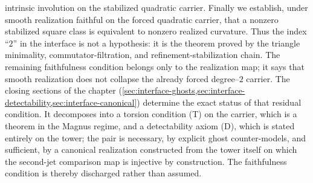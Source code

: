 intrinsic involution on the stabilized quadratic carrier.
Finally we establish, under smooth realization faithful on the forced
quadratic carrier, that a nonzero stabilized square class is equivalent
to nonzero realized curvature.
Thus the index ``\(2\)'' in the interface is not a hypothesis: it is
the theorem proved by the triangle minimality, commutator-filtration,
and refinement-stabilization chain.  The remaining faithfulness
condition belongs only to the realization map; it says that smooth
realization does not collapse the already forced degree--\(2\) carrier.
The closing sections of the chapter
(\cref{sec:interface-ghosts,sec:interface-detectability,sec:interface-canonical})
determine the exact status of that residual condition.  It decomposes
into a torsion condition \textup{(T)} on the carrier, which is a
theorem in the Magnus regime, and a detectability axiom \textup{(D)},
which is stated entirely on the tower; the pair is necessary, by
explicit ghost counter-models, and sufficient, by a canonical
realization constructed from the tower itself on which the second-jet
comparison map is injective by construction.  The faithfulness
condition is thereby discharged rather than assumed.
